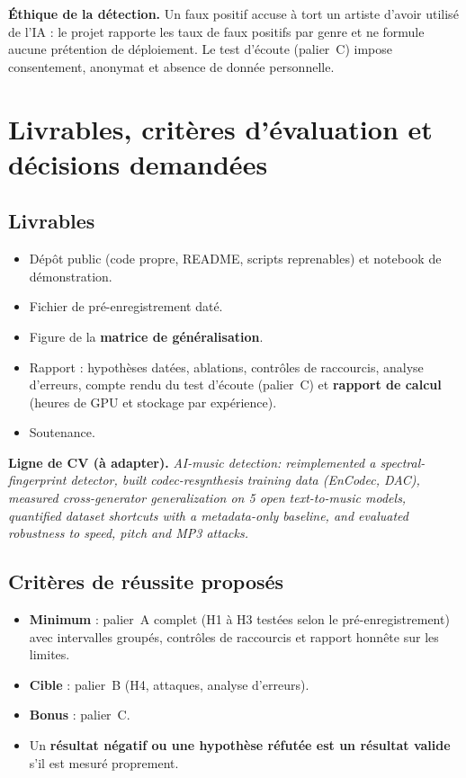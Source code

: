 \documentclass[11pt,a4paper]{article}
\begin{document}
\textbf{Éthique de la détection.} Un faux positif accuse à tort un artiste d'avoir utilisé de l'IA : le projet rapporte les taux de faux positifs par genre et ne formule aucune prétention de déploiement. Le test d'écoute (palier~C) impose consentement, anonymat et absence de donnée personnelle.

\section{Livrables, critères d'évaluation et décisions demandées}
\label{sec:livrables}

\subsection{Livrables}

\begin{itemize}
  \item Dépôt public (code propre, README, scripts reprenables) et notebook de démonstration.
  \item Fichier de pré-enregistrement daté.
  \item Figure de la \textbf{matrice de généralisation}.
  \item Rapport : hypothèses datées, ablations, contrôles de raccourcis, analyse d'erreurs, compte rendu du test d'écoute (palier~C) et \textbf{rapport de calcul} (heures de GPU et stockage par expérience).
  \item Soutenance.
\end{itemize}

\textbf{Ligne de CV (à adapter).} \emph{AI-music detection: reimplemented a spectral-fingerprint detector, built codec-resynthesis training data (EnCodec, DAC), measured cross-generator generalization on 5 open text-to-music models, quantified dataset shortcuts with a metadata-only baseline, and evaluated robustness to speed, pitch and MP3 attacks.}

\subsection{Critères de réussite proposés}

\begin{itemize}
  \item \textbf{Minimum} : palier~A complet (H1 à H3 testées selon le pré-enregistrement) avec intervalles groupés, contrôles de raccourcis et rapport honnête sur les limites.
  \item \textbf{Cible} : palier~B (H4, attaques, analyse d'erreurs).
  \item \textbf{Bonus} : palier~C.
  \item Un \textbf{résultat négatif ou une hypothèse réfutée est un résultat valide} s'il est mesuré proprement.
\end{itemize}
\end{document}

